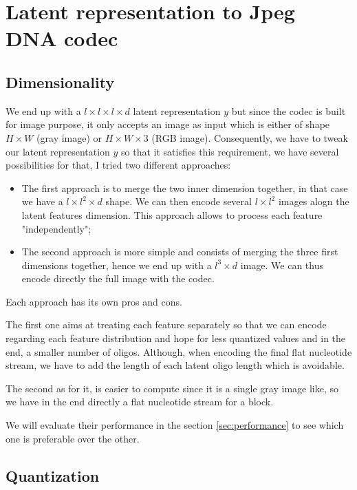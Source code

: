 \section{Latent representation to Jpeg DNA codec}

\subsection{Dimensionality}

We end up with a $l \times l \times l \times d$ latent representation $y$ but since the codec is built for image purpose, it only accepts an image as input which is either of shape $H \times W$ (gray image) or $H \times W \times 3$ (RGB image). 
Consequently, we have to tweak our latent representation $y$ so that it satisfies this requirement, we have several possibilities for that, I tried two different approaches:

\begin{itemize}
    \item The first approach is to merge the two inner dimension together, in that case we have a $l \times l^2 \times d$ shape. We can then encode several $l \times l^2$ images alogn the latent features dimension. This approach allows to process each feature "independently";
    \item The second approach is more simple and consists of merging the three first dimensions together, hence we end up with a $l^3 \times d$ image. We can thus encode directly the full image with the codec.
\end{itemize}

Each approach has its own pros and cons. 

The first one aims at treating each feature separately so that we can encode regarding each feature distribution and hope for less quantized values and in the end, a smaller number of oligos. Although, when encoding the final flat nucleotide stream, we have to add the length of each latent oligo length which is avoidable.

The second as for it, is easier to compute since it is a single gray image like, so we have in the end directly a flat nucleotide stream for a block. 

We will evaluate their performance in the section \ref{sec:performance} to see which one is preferable over the other.

\subsection{Quantization}

